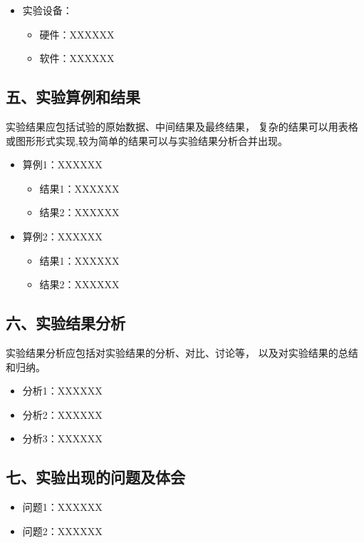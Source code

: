 \documentclass[12pt,a4paper,oneside,UTF8]{ctexart}
\begin{document}
  \begin{itemize}
      \item 实验设备：
      \begin{itemize}
  	\item 硬件：XXXXXX
  	\item 软件：XXXXXX
      \end{itemize}
  \end{itemize}

	\subsection*{五、实验算例和结果}
  实验结果应包括试验的原始数据、中间结果及最终结果，
  复杂的结果可以用表格或图形形式实现,较为简单的结果可以与实验结果分析合并出现。\\
  \begin{itemize}
  	\item 算例1：XXXXXX
  	\begin{itemize}
  		\item 结果1：XXXXXX
  		\item 结果2：XXXXXX
  	\end{itemize}

  	\item 算例2：XXXXXX
  	\begin{itemize}
  		\item 结果1：XXXXXX
  		\item 结果2：XXXXXX
  	\end{itemize}
  \end{itemize}

  \subsection*{六、实验结果分析}
  实验结果分析应包括对实验结果的分析、对比、讨论等，  
  以及对实验结果的总结和归纳。\\  
  \begin{itemize}
  	\item 分析1：XXXXXX
  	\item 分析2：XXXXXX
  	\item 分析3：XXXXXX
  \end{itemize}

  \subsection*{七、实验出现的问题及体会}
  
  \begin{itemize}
    \item 问题1：XXXXXX
    \item 问题2：XXXXXX
  \end{itemize}
\end{document}
